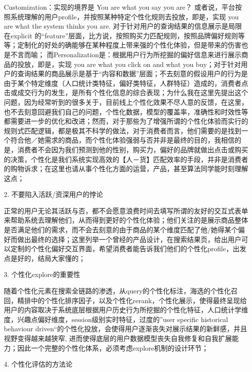 Customization：实现的境界是 You are what you say you are？ 或者说，平台按照系统理解的用户profile，并按照某种特定个性化规则去投放，即是，实现 you are what the system thinks you are. 对于针对用户的查询结果的信息展示是局限在explicit 的“feature”层面，比方说，按照购买力匹配规则，按照品牌偏好规则等等；定制化的好处的确能够在某种程度上带来强的个性化体验，但是带来的伤害也是不言而喻；
而Personalization是：根据用户行为所挖掘的偏好信息来进行展示商品的投放，即是，实现 you are what you click on and what you buy；对于针对用户的查询结果的商品展示是基于“内容和数据”层面；不去刻意的假设用户的行为是由于某个特定维度（人口统计类特征，偏好类特征，人群特征）造成的，消费者点击或成交行为的发生，是所有个性化信息的综合表现；为什么我在这里先提出这个问题，因为经常听到的很多关于，目前线上个性化效果不尽人意的反馈，在这里，也不去刻意回避我们自己的问题，个性化数据，模型的覆盖率，准确性和时效性等都需要进一步的优化和改进；然而，对于那些为了增强所谓的个性化体验而实行的规则式匹配逻辑，都是极其不科学的做法，对于消费者而言，他们需要的是找到一个符合他／她需求的商品，而个性化体验强弱与否并非是最终的目的，我相信的是，消费者不会因为我们预测到他的性别，购买力，偏好的品牌就做出点击或购买的决策，个性化是我们系统实现高效的【人－货】匹配效率的手段，并非是消费者的购物诉求；在这里也请从事个性化方面的运营，产品，甚至算法同学能时刻理解这点；

2. 不要陷入活跃/资深用户的悖论

正常的用户无论其活跃与否，都不会愿意浪费时间去填写所谓的友好的交互式表单来帮助系统去理解他们，从而得到更好的个性化体验；他们关注的是展示商品整体是否满足他们的需求，而不会去刻意的由于商品的某个维度匹配了他/她得某个偏好而做出最终的选择；这里列举一个曾经的产品设计，在搜索结果页，给出用户可以定制的个性化偏好交互界面，希望消费者能告诉我们他们的个性化profile，出发点是好的，结局大家懂的；

3. 个性化explore的重要性

随着个性化元素在搜索全链路的渗透，从query的个性化标注，海选的个性化召回，精排中的个性化排序因子，以及个性化rerank，个性化展示，使得最终呈现给用户的内容取决于系统底层根据用户历史行为所挖掘的个性化特征，人口统计学维度，兴趣点偏好维度，session级别实时特征，过度的”user specific historical behaviour driven“的个性化投放，会使得用户逐渐丧失对展示结果的新鲜感，并且视野变得越来越狭窄, 进而使得底层的用户数据模型丧失自我修复和自我扩展能力；因此一个完整的个性化体系，必须考虑explore机制的设计环节；

4. 个性化评估的方法论

